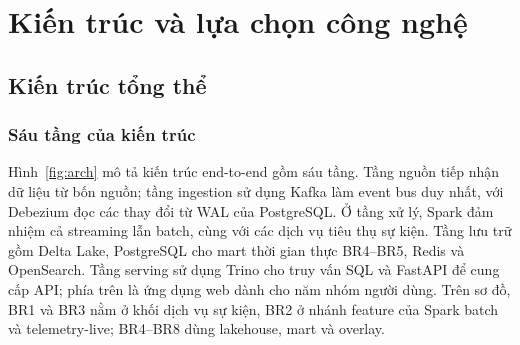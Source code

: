 \chapter{Kiến trúc và lựa chọn công nghệ}
\label{chap:architecture}

\section{Kiến trúc tổng thể}

\subsection{Sáu tầng của kiến trúc}

Hình~\ref{fig:arch} mô tả kiến trúc end-to-end gồm sáu tầng. Tầng nguồn tiếp nhận dữ liệu từ bốn nguồn; tầng ingestion sử dụng Kafka làm event bus duy nhất, với Debezium đọc các thay đổi từ WAL của PostgreSQL. Ở tầng xử lý, Spark đảm nhiệm cả streaming lẫn batch, cùng với các dịch vụ tiêu thụ sự kiện. Tầng lưu trữ gồm Delta Lake, PostgreSQL cho mart thời gian thực BR4--BR5, Redis và OpenSearch. Tầng serving sử dụng Trino cho truy vấn SQL và FastAPI để cung cấp API; phía trên là ứng dụng web dành cho năm nhóm người dùng. Trên sơ đồ, BR1 và BR3 nằm ở khối dịch vụ sự kiện, BR2 ở nhánh feature của Spark batch và telemetry-live; BR4--BR8 dùng lakehouse, mart và overlay.

